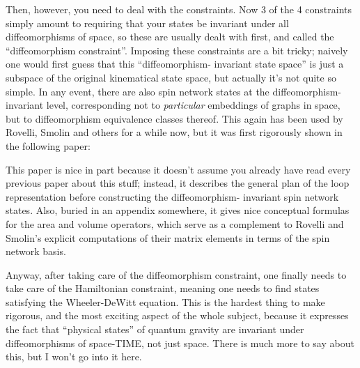 \documentclass{article}
\def\tightlist{}
\renewcommand{\texttt}[1]{%
  \begingroup
  \ttfamily
  \begingroup\lccode`~=`/\lowercase{\endgroup\def~}{/\discretionary{}{}{}}%
  \begingroup\lccode`~=`[\lowercase{\endgroup\def~}{[\discretionary{}{}{}}%
  \begingroup\lccode`~=`.\lowercase{\endgroup\def~}{.\discretionary{}{}{}}%
  \catcode`/=\active\catcode`[=\active\catcode`.=\active
  \scantokens{#1\noexpand}%
  \endgroup
}
\begin{document}
Then, however, you need to deal with the constraints. Now 3 of the 4
constraints simply amount to requiring that your states be invariant
under all diffeomorphisms of space, so these are usually dealt with
first, and called the ``diffeomorphism constraint''. Imposing these
constraints are a bit tricky; naively one would first guess that this
``diffeomorphism- invariant state space'' is just a subspace of the
original kinematical state space, but actually it's not quite so simple.
In any event, there are also spin network states at the
diffeomorphism-invariant level, corresponding not to \emph{particular}
embeddings of graphs in space, but to diffeomorphism equivalence classes
thereof. This again has been used by Rovelli, Smolin and others for a
while now, but it was first rigorously shown in the following paper:


This paper is nice in part because it doesn't assume you already have
read every previous paper about this stuff; instead, it describes the
general plan of the loop representation before constructing the
diffeomorphism- invariant spin network states. Also, buried in an
appendix somewhere, it gives nice conceptual formulas for the area and
volume operators, which serve as a complement to Rovelli and Smolin's
explicit computations of their matrix elements in terms of the spin
network basis.

Anyway, after taking care of the diffeomorphism constraint, one finally
needs to take care of the Hamiltonian constraint, meaning one needs to
find states satisfying the Wheeler-DeWitt equation. This is the hardest
thing to make rigorous, and the most exciting aspect of the whole
subject, because it expresses the fact that ``physical states'' of
quantum gravity are invariant under diffeomorphisms of space-TIME, not
just space. There is much more to say about this, but I won't go into it
here.
\end{document}

